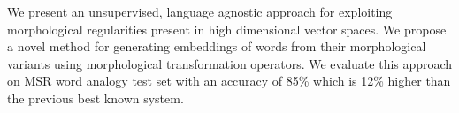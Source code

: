 We present an unsupervised, language agnostic approach for exploiting morphological regularities present in high dimensional vector spaces. We propose a novel method for generating embeddings of words from their morphological variants using morphological transformation operators. We evaluate this approach on MSR word analogy test set with an accuracy of 85\% which is 12\% higher than the previous best known system.
